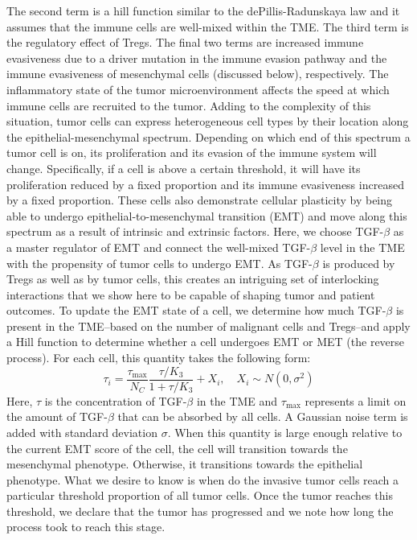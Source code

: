 \documentclass[11pt]{article}
\begin{document}
\begin{framed}
    The second term is a hill function similar to the dePillis-Radunskaya law and it assumes that the immune cells are well-mixed within the TME.
    The third term is the regulatory effect of Tregs.
    The final two terms are increased immune evasiveness due to a driver mutation in the immune evasion pathway and the immune evasiveness of mesenchymal cells (discussed below), respectively.
    The inflammatory state of the tumor microenvironment affects the speed at which immune cells are recruited to the tumor.
    \newline
    Adding to the complexity of this situation, tumor cells can express heterogeneous cell types by their location along the epithelial-mesenchymal spectrum.
    Depending on which end of this spectrum a tumor cell is on, its proliferation and its evasion of the immune system will change.
    Specifically, if a cell is above a certain threshold, it will have its proliferation reduced by a fixed proportion and its immune evasiveness increased by a fixed proportion.
    These cells also demonstrate cellular plasticity by being able to undergo epithelial-to-mesenchymal transition (EMT) and move along this spectrum as a result of intrinsic and extrinsic factors.
    Here, we choose TGF-$\beta$ as a master regulator of EMT and connect the well-mixed TGF-$\beta$ level in the TME with the propensity of tumor cells to undergo EMT.
    As TGF-$\beta$ is produced by Tregs as well as by tumor cells, this creates an intriguing set of interlocking interactions that we show here to be capable of shaping tumor and patient outcomes.
    To update the EMT state of a cell, we determine how much TGF-$\beta$ is present in the TME--based on the number of malignant cells and Tregs--and apply a Hill function to determine whether a cell undergoes EMT or MET (the reverse process).
    For each cell, this quantity takes the following form:
    $$
    \tau_i = \frac{\tau_{\text{max}}}{N_C}\frac{\tau/K_3}{1+\tau/K_3} + X_i, \quad X_i \sim N(0,\sigma^2)
    $$
    Here, $\tau$ is the concentration of TGF-$\beta$ in the TME and $\tau_\text{max}$ represents a limit on the amount of TGF-$\beta$ that can be absorbed by all cells.
    A Gaussian noise term is added with standard deviation $\sigma$.
    When this quantity is large enough relative to the current EMT score of the cell, the cell will transition towards the mesenchymal phenotype.
    Otherwise, it transitions towards the epithelial phenotype.
    \newline
    What we desire to know is when do the invasive tumor cells reach a particular threshold proportion of all tumor cells.
    Once the tumor reaches this threshold, we declare that the tumor has progressed and we note how long the process took to reach this stage.
  \end{framed}
\end{document}
